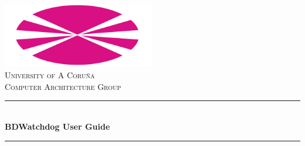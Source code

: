 \documentclass[12pt]{article}
\begin{document}
	
	\begin{titlepage}
		
		\newcommand{\HRule}{\rule{\linewidth}{0.5mm}} %
		
		\center %
		
		
		\includegraphics[width=0.5\textwidth]{udc_logo.png}\\[1cm]
		
		\textsc{\LARGE University of A Coruña}\\[1.5cm] %
		\textsc{\Large Computer Architecture Group}\\[0.5cm] %
		
		
		\HRule \\[0.4cm]
		{ \huge \bfseries BDWatchdog User Guide}\\[0.3cm] %
		\HRule \\[1.5cm]
		
		
		

\end{titlepage}
\end{document}
